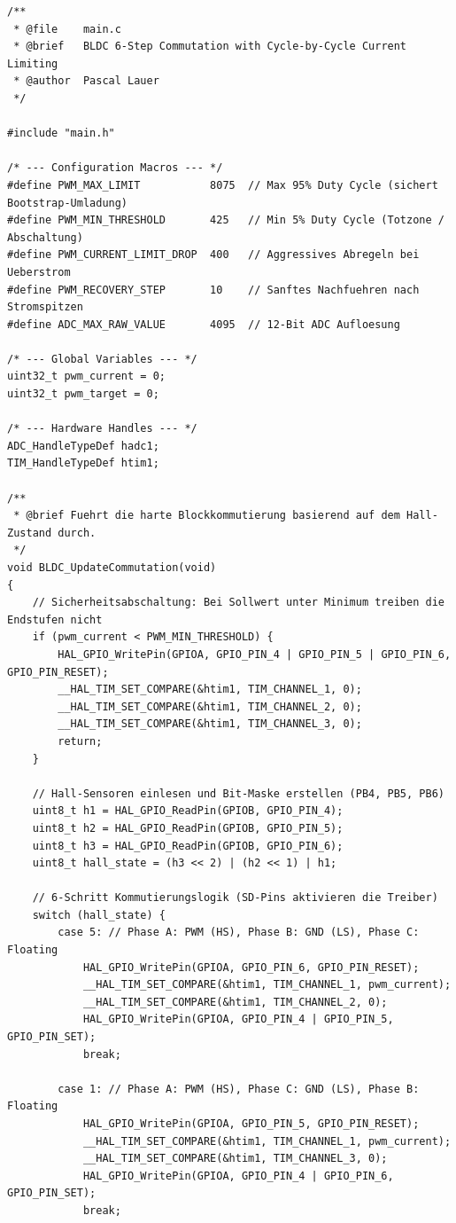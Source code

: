 \begin{lstlisting}[caption={Kernlogik der 6-Step Blockkommutierung und Strombegrenzung}, label={lst:stm32_code}]
/**
 * @file    main.c
 * @brief   BLDC 6-Step Commutation with Cycle-by-Cycle Current Limiting
 * @author  Pascal Lauer
 */

#include "main.h"

/* --- Configuration Macros --- */
#define PWM_MAX_LIMIT           8075  // Max 95% Duty Cycle (sichert Bootstrap-Umladung)
#define PWM_MIN_THRESHOLD       425   // Min 5% Duty Cycle (Totzone / Abschaltung)
#define PWM_CURRENT_LIMIT_DROP  400   // Aggressives Abregeln bei Ueberstrom
#define PWM_RECOVERY_STEP       10    // Sanftes Nachfuehren nach Stromspitzen
#define ADC_MAX_RAW_VALUE       4095  // 12-Bit ADC Aufloesung

/* --- Global Variables --- */
uint32_t pwm_current = 0;
uint32_t pwm_target = 0; 

/* --- Hardware Handles --- */
ADC_HandleTypeDef hadc1;
TIM_HandleTypeDef htim1;

/**
 * @brief Fuehrt die harte Blockkommutierung basierend auf dem Hall-Zustand durch.
 */
void BLDC_UpdateCommutation(void)
{
    // Sicherheitsabschaltung: Bei Sollwert unter Minimum treiben die Endstufen nicht
    if (pwm_current < PWM_MIN_THRESHOLD) {
        HAL_GPIO_WritePin(GPIOA, GPIO_PIN_4 | GPIO_PIN_5 | GPIO_PIN_6, GPIO_PIN_RESET);
        __HAL_TIM_SET_COMPARE(&htim1, TIM_CHANNEL_1, 0);
        __HAL_TIM_SET_COMPARE(&htim1, TIM_CHANNEL_2, 0);
        __HAL_TIM_SET_COMPARE(&htim1, TIM_CHANNEL_3, 0);
        return;
    }

    // Hall-Sensoren einlesen und Bit-Maske erstellen (PB4, PB5, PB6)
    uint8_t h1 = HAL_GPIO_ReadPin(GPIOB, GPIO_PIN_4);
    uint8_t h2 = HAL_GPIO_ReadPin(GPIOB, GPIO_PIN_5);
    uint8_t h3 = HAL_GPIO_ReadPin(GPIOB, GPIO_PIN_6);
    uint8_t hall_state = (h3 << 2) | (h2 << 1) | h1;

    // 6-Schritt Kommutierungslogik (SD-Pins aktivieren die Treiber)
    switch (hall_state) {
        case 5: // Phase A: PWM (HS), Phase B: GND (LS), Phase C: Floating
            HAL_GPIO_WritePin(GPIOA, GPIO_PIN_6, GPIO_PIN_RESET);
            __HAL_TIM_SET_COMPARE(&htim1, TIM_CHANNEL_1, pwm_current);
            __HAL_TIM_SET_COMPARE(&htim1, TIM_CHANNEL_2, 0); 
            HAL_GPIO_WritePin(GPIOA, GPIO_PIN_4 | GPIO_PIN_5, GPIO_PIN_SET);
            break;
            
        case 1: // Phase A: PWM (HS), Phase C: GND (LS), Phase B: Floating
            HAL_GPIO_WritePin(GPIOA, GPIO_PIN_5, GPIO_PIN_RESET); 
            __HAL_TIM_SET_COMPARE(&htim1, TIM_CHANNEL_1, pwm_current);
            __HAL_TIM_SET_COMPARE(&htim1, TIM_CHANNEL_3, 0); 
            HAL_GPIO_WritePin(GPIOA, GPIO_PIN_4 | GPIO_PIN_6, GPIO_PIN_SET);
            break;
            

\end{lstlisting}
